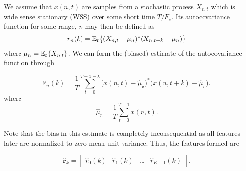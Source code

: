 


We assume that $x(n,t)$ are samples from a stochastic process $X_{n,t}$ which is wide sense stationary (WSS) \citep{jakobsson_2015} over some short time $T/F_s$. Its autocovariance function for some range, $n$ may then be defined as
\begin{equation}
	r_n(k) = {\operatorname*{\mathbb{E}}}_t\big\{(X_{n,t} - \mu_n)^*(X_{n,t+k} - \mu_n)\big\}
\end{equation}
where $\mu_n=\operatorname*{\mathbb{E}}_t\{X_{n,t}\}$. We can form the (biased) estimate of the autocovariance function through

\begin{equation}
	\hat{r}_n(k) = \frac{1}{T}\sum_{t=0}^{T-1-k}\big(x(n,t) - \hat{\mu}_n\big)^*\big(x(n,t+k) - \hat{\mu}_n\big).
\end{equation}
where 
\begin{equation}
	\hat{\mu}_n = \frac1T \sum_{t=0}^{T-1}x(n,t).
\end{equation}

Note that the bias in this estimate is completely inconsequential as all features later are normalized to zero mean unit variance.  Thus, the features formed are

\begin{equation}
	\hat{\mathbf{r}}_{k} = 
	\begin{bmatrix}
		\hat{r}_0(k) & \hat{r}_1(k) & ... & \hat{r}_{K-1}(k)
	\end{bmatrix}.
\end{equation}

